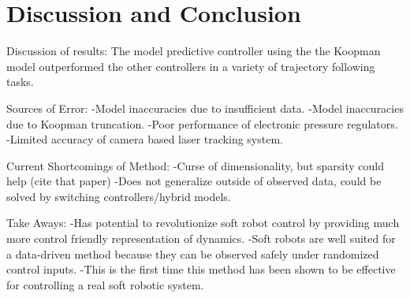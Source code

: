 \section{Discussion and Conclusion}
\label{sec:conclusion}

Discussion of results:
The model predictive controller using the the Koopman model outperformed the other controllers in a variety of trajectory following tasks.

Sources of Error:
-Model inaccuracies due to insufficient data.
-Model inaccuracies due to Koopman truncation.
-Poor performance of electronic pressure regulators.
-Limited accuracy of camera based laser tracking system.

Current Shortcomings of Method:
-Curse of dimensionality, but sparsity could help (cite that paper)
-Does not generalize outside of observed data, could be solved by switching controllers/hybrid models.

Take Aways:
-Has potential to revolutionize soft robot control by providing much more control friendly representation of dynamics.
-Soft robots are well suited for a data-driven method because they can be observed safely under randomized control inputs.
-This is the first time this method has been shown to be effective for controlling a real soft robotic system.